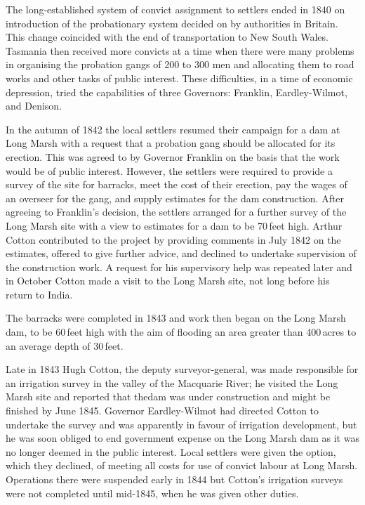 The long-established system of convict assignment  to settlers end\-ed in 1840 on introduction of the
probationary system decided on by authorities in Britain.  This change
coincided with the end of transportation to New South Wales.  Tasmania
then received more convicts at a time when there were many problems in
organising the probation gangs of 200 to 300 men and allocating them
to road works and other tasks of public interest.  These difficulties,
in a time of economic depression, tried the capabilities of three
Governors: Franklin, Eardley-Wilmot, and
Denison. 

In the autumn of 1842 the local settlers resumed their campaign for a
dam at Long Marsh with a request that a
probation gang should be allocated for its erection.  This was agreed
to by Governor Franklin  on the basis that
the work would be of public interest.  However, the settlers were
required to provide a survey of the site for barracks, meet the cost
of their erection, pay the wages of an overseer for the gang, and
supply estimates for the dam construction.
After agreeing to Franklin's decision, the settlers arranged for a
further survey of the Long Marsh site with a view to estimates for a
dam to be 70\,feet high.  Arthur Cotton  contributed
to the project by providing comments in July 1842 on the estimates,
offered to give further advice, and declined to undertake supervision
of the construction work.  A request for his supervisory help was
repeated later and in October Cotton made a visit to the Long Marsh
site, not long before his return to India.

The barracks were completed in 1843 and work then began on the Long
Marsh dam, to be 60\,feet high with the aim of
flooding an area greater than 400\,acres to
an average depth of 30\,feet.

Late in 1843 Hugh Cotton,  the deputy
surveyor-general, was made responsible for an irrigation survey in the
valley of the Macquarie River;  he visited the
Long Marsh site and reported that thedam was
under construction and might be finished by June 1845.  Governor
Eardley-Wilmot  had directed Cotton to
undertake the survey and was apparently in favour of irrigation
development, but he was soon obliged to end government expense on the
Long Marsh dam as it was no longer deemed in the public interest.
Local settlers were given the option, which they declined, of meeting
all costs for use of convict labour  at Long
Marsh.  Operations there were suspended early in 1844 but Cotton's
irrigation surveys were not completed until mid-1845, when he was
given other duties.

